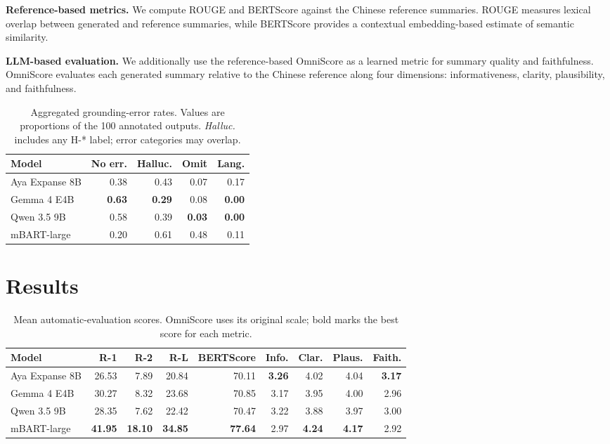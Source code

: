 \documentclass[11pt]{article}
\begin{document}
\noindent\textbf{Reference-based metrics.} We compute ROUGE \citep{lin-2004-rouge} and BERTScore \citep{zhang2020bertscoreevaluatingtextgeneration} against the Chinese reference summaries. ROUGE measures lexical overlap between generated and reference summaries, while BERTScore provides a contextual embedding-based estimate of semantic similarity.

\noindent\textbf{LLM-based evaluation.} We additionally use the reference-based OmniScore \citep{alam-etal-2026-omniscore} as a learned metric for summary quality and faithfulness. OmniScore evaluates each generated summary relative to the Chinese reference along four dimensions: informativeness, clarity, plausibility, and faithfulness.

\begin{table}[H]
\centering
\small
\begin{tabular}{lrrrr}
\hline
Model & No err. & Halluc. & Omit & Lang. \\
\hline
Aya Expanse 8B & 0.38 & 0.43 & 0.07 & 0.17 \\
Gemma 4 E4B    & \textbf{0.63} & \textbf{0.29} & 0.08 & \textbf{0.00} \\
Qwen 3.5 9B    & 0.58 & 0.39 & \textbf{0.03} & \textbf{0.00} \\
mBART-large    & 0.20 & 0.61 & 0.48 & 0.11 \\
\hline
\end{tabular}
\caption{Aggregated grounding-error rates. Values are proportions of the 100 annotated outputs. \textit{Halluc.} includes any \textsc{H-*} label; error categories may overlap.}
\label{tab:grounding-results}
\end{table}

\section{Results}

\begin{table}[!t]
\centering
\small
\begin{tabular*}{\textwidth}{@{\extracolsep{\fill}}lrrrrrrrr@{}}
\hline
Model & R-1 & R-2 & R-L & BERTScore & Info. & Clar. & Plaus. & Faith. \\
\hline
Aya Expanse 8B & 26.53 & 7.89 & 20.84 & 70.11 & \textbf{3.26} & 4.02 & 4.04 & \textbf{3.17} \\
Gemma 4 E4B    & 30.27 & 8.32 & 23.68 & 70.85 & 3.17 & 3.95 & 4.00 & 2.96 \\
Qwen 3.5 9B    & 28.35 & 7.62 & 22.42 & 70.47 & 3.22 & 3.88 & 3.97 & 3.00 \\
mBART-large    & \textbf{41.95} & \textbf{18.10} & \textbf{34.85} &
\textbf{77.64} & 2.97 & \textbf{4.24} & \textbf{4.17} & 2.92 \\
\hline
\end{tabular*}
\caption{Mean automatic-evaluation scores. OmniScore uses its original scale; bold marks the best score for each metric.}
\label{tab:automatic-results}
\end{table}
\end{document}
